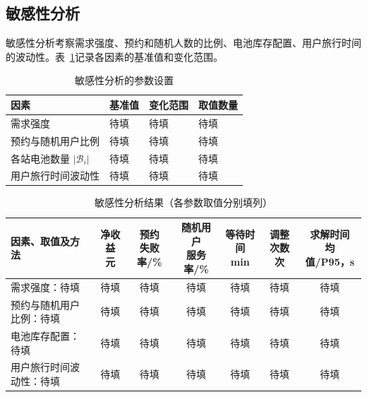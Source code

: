 

\FloatBarrier
\subsection{敏感性分析}
\label{exp:sensitivity}

敏感性分析考察需求强度、预约和随机人数的比例、电池库存配置、用户旅行时间的波动性。表~\ref{exp:sensitivity_settings}记录各因素的基准值和变化范围。

\begin{table}[!htbp]
  \centering
  \caption{敏感性分析的参数设置}
  \label{exp:sensitivity_settings}
  \small
  \begin{tabularx}{\linewidth}{@{}Xlll@{}}
    \toprule
    因素 & 基准值 & 变化范围 & 取值数量 \\
    \midrule
    需求强度 & 待填 & 待填 & 待填 \\
    预约与随机用户比例 & 待填 & 待填 & 待填 \\
    各站电池数量 $|\mathcal B_i|$ & 待填 & 待填 & 待填 \\
    用户旅行时间波动性 & 待填 & 待填 & 待填 \\
    \bottomrule
  \end{tabularx}
\end{table}



\begin{table}[!htbp]
  \centering
  \caption{敏感性分析结果（各参数取值分别填列）}
  \label{exp:sensitivity_results}
  \small
  \setlength{\tabcolsep}{3pt}
  \begin{tabularx}{\linewidth}{@{}Xcccccc@{}}
    \toprule
    因素、取值及方法 & \shortstack{净收益\\元} & \shortstack{预约\\失败率/\%} & \shortstack{随机用户\\服务率/\%} & \shortstack{等待时间\\min} & \shortstack{调整次数\\次} & \shortstack{求解时间\\均值/P95，s} \\
    \midrule
    需求强度：待填 & 待填 & 待填 & 待填 & 待填 & 待填 & 待填 \\
    预约与随机用户比例：待填 & 待填 & 待填 & 待填 & 待填 & 待填 & 待填 \\
    电池库存配置：待填 & 待填 & 待填 & 待填 & 待填 & 待填 & 待填 \\
    用户旅行时间波动性：待填 & 待填 & 待填 & 待填 & 待填 & 待填 & 待填 \\
    \bottomrule
  \end{tabularx}
\end{table}

